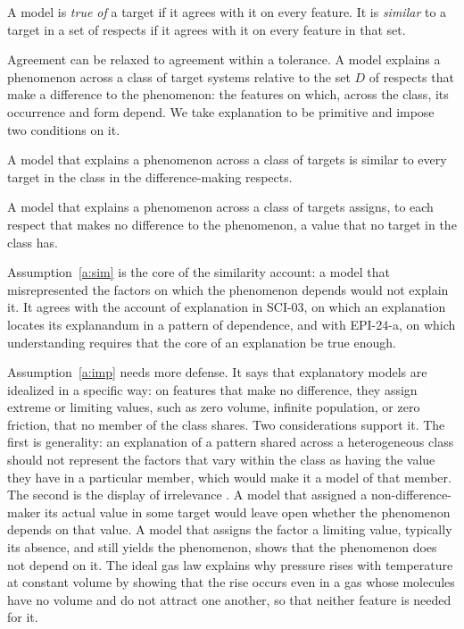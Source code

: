 \documentclass{situationist-preprint}
\begin{document}
\begin{definition}\label{d:truth}
A model is \emph{true of} a target if it agrees with it on every feature. It is \emph{similar} to a target in a set of respects if it agrees with it on every feature in that set.
\end{definition}

Agreement can be relaxed to agreement within a tolerance. A model explains a phenomenon across a class of target systems relative to the set $D$ of respects that make a difference to the phenomenon: the features on which, across the class, its occurrence and form depend. We take explanation to be primitive and impose two conditions on it.

\begin{assumption}[Similarity]\label{a:sim}
A model that explains a phenomenon across a class of targets is similar to every target in the class in the difference-making respects.
\end{assumption}

\begin{assumption}[Impartiality]\label{a:imp}
A model that explains a phenomenon across a class of targets assigns, to each respect that makes no difference to the phenomenon, a value that no target in the class has.
\end{assumption}

Assumption~\ref{a:sim} is the core of the similarity account: a model that misrepresented the factors on which the phenomenon depends would not explain it. It agrees with the account of explanation in SCI-03, on which an explanation locates its explanandum in a pattern of dependence, and with EPI-24-a, on which understanding requires that the core of an explanation be true enough.

Assumption~\ref{a:imp} needs more defense. It says that explanatory models are idealized in a specific way: on features that make no difference, they assign extreme or limiting values, such as zero volume, infinite population, or zero friction, that no member of the class shares. Two considerations support it. The first is generality: an explanation of a pattern shared across a heterogeneous class should not represent the factors that vary within the class as having the value they have in a particular member, which would make it a model of that member. The second is the display of irrelevance \citep{Strevens2008}. A model that assigned a non-difference-maker its actual value in some target would leave open whether the phenomenon depends on that value. A model that assigns the factor a limiting value, typically its absence, and still yields the phenomenon, shows that the phenomenon does not depend on it. The ideal gas law explains why pressure rises with temperature at constant volume by showing that the rise occurs even in a gas whose molecules have no volume and do not attract one another, so that neither feature is needed for it.
\end{document}
